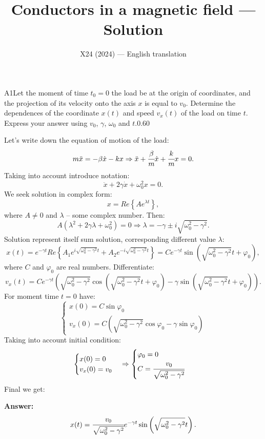 \documentclass[11pt,a4paper]{article}
\title{\textbf{Conductors in a magnetic field --- Solution}}
\author{\normalsize X24 (2024) — English translation}
\date{}
\begin{document}
\maketitle\vspace{-0.5em}
\begin{solcard}{A1}{Let the moment of time $t_0=0$ the load be at the origin of coordinates, and the projection of its velocity onto the axis $x$ is equal to $v_0$. Determine the dependences of the coordinate $x(t)$ and speed $v_x(t)$ of the load on time $t$. Express your answer using $v_0$, $\gamma$, $\omega_0$ and $t$.}{0.60}

Let's write down the equation of motion of the load: $$m\ddot{x}=-\beta\dot{x}-kx\Rightarrow \ddot{x}+\cfrac{\beta}{m}\dot{x}+\cfrac{k}{m}x=0{.} $$Taking into account introduce notation: $$\ddot{x}+2\gamma\dot{x}+\omega^2_0x=0{.} $$We seek solution in complex form: $$x=Re\left\{Ae^{\lambda t}\right\}{,} $$where $A\neq 0$ and $\lambda$ – some complex number. Then: $$A\left(\lambda^2+2\gamma\lambda+\omega^2_0\right)=0\Rightarrow{\lambda=-\gamma\pm{i\sqrt{\omega^2_0-\gamma^2}}}{.} $$Solution represent itself sum solution, corresponding different value $\lambda$: $$x(t)=e^{-\gamma t}Re\left\{A_1e^{i\sqrt{\omega^2_0-\gamma^2}t}+A_2e^{-i\sqrt{\omega^2_0-\gamma^2}t}\right\}=Ce^{-\gamma t}\sin\left(\sqrt{\omega^2_0-\gamma^2}t+\varphi_0\right){,} $$where $C$ and $\varphi_0$ are real numbers. Differentiate: $$v_x(t)=Ce^{-\gamma t}\left(\sqrt{\omega^2_0-\gamma^2}\cos\left(\sqrt{\omega^2_0-\gamma^2}t+\varphi_0\right)-\gamma\sin\left(\sqrt{\omega^2_0-\gamma^2}t+\varphi_0\right)\right){.} $$For moment time $t=0$ have: $$\begin{cases} x(0)=C\sin\varphi_0\\ v_x(0)=C\left(\sqrt{\omega^2_0-\gamma^2}\cos\varphi_0-\gamma\sin\varphi_0\right) \end{cases} $$Taking into account initial condition: $$\begin{cases} x(0)=0\\ v_x(0)=v_0 \end{cases} \Rightarrow \begin{cases} \varphi_0=0\\ C=\cfrac{v_0}{\sqrt{\omega^2_0-\gamma^2}} \end{cases} $$Final we get:

\par\smallskip\noindent\textbf{Answer:} $$x(t)=\cfrac{v_0}{\sqrt{\omega^2_0-\gamma^2}}e^{-\gamma t}\sin\left(\sqrt{\omega^2_0-\gamma^2}t\right){.} $$
\end{solcard}
\end{document}
